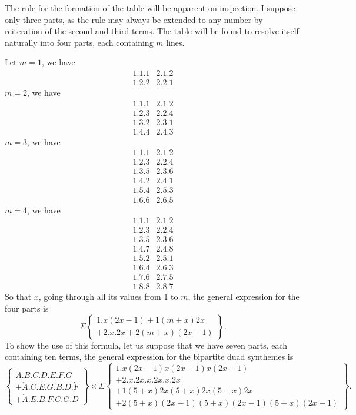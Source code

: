 \documentclass[11pt]{article}
\newcommand{\sourcepage}[1]{\marginpar{\scriptsize p.~#1}}
\newcommand{\dotter}[1]{\dot{#1}}
\begin{document}
\sourcepage{100}
The rule for the formation of the table will be apparent on inspection. I suppose only three parts, as the rule may always be extended to any number by reiteration of the second and third terms. The table will be found to resolve itself naturally into four parts, each containing $m$ lines.

Let $m=1$, we have
\[
\begin{array}{cc}
1.1.1&2.1.2\\
1.2.2&2.2.1
\end{array}
\]
$m=2$, we have
\[
\begin{array}{cc}
1.1.1&2.1.2\\
1.2.3&2.2.4\\
1.3.2&2.3.1\\
1.4.4&2.4.3
\end{array}
\]
$m=3$, we have
\[
\begin{array}{cc}
1.1.1&2.1.2\\
1.2.3&2.2.4\\
1.3.5&2.3.6\\
1.4.2&2.4.1\\
1.5.4&2.5.3\\
1.6.6&2.6.5
\end{array}
\]
$m=4$, we have
\[
\begin{array}{cc}
1.1.1&2.1.2\\
1.2.3&2.2.4\\
1.3.5&2.3.6\\
1.4.7&2.4.8\\
1.5.2&2.5.1\\
1.6.4&2.6.3\\
1.7.6&2.7.5\\
1.8.8&2.8.7
\end{array}
\]
So that $x$, going through all its values from 1 to $m$, the general expression for the four parts is
\[
\Sigma\left\{\begin{array}{l}
1.x(2x-1)+1(m+x)2x\\
+2.x.2x+2(m+x)(2x-1)
\end{array}\right\}.
\]
To show the use of this formula, let us suppose that we have seven parts, each containing ten terms, the general expression for the bipartite duad synthemes is
\[
\left\{\begin{array}{l}
\dotter A.B.C.D.E.F.\dotter G\\
+\dotter A.C.E.G.B.D.\dotter F\\
+\dotter A.E.B.F.C.G.\dotter D
\end{array}\right\}
\times \Sigma
\left\{\begin{array}{l}
1.x(2x-1)x(2x-1)x(2x-1)\\
+2.x.2x.x.2x.x.2x\\
+1(5+x)2x(5+x)2x(5+x)2x\\
+2(5+x)(2x-1)(5+x)(2x-1)(5+x)(2x-1)
\end{array}\right\}.
\]
\end{document}
